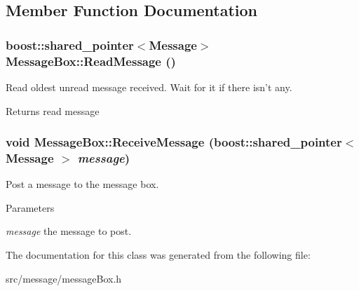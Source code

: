 \subsection{Member Function Documentation}
\hypertarget{classMessageBox_aea4614d2371b253e2e96f602bdd9c557}{
\subsubsection[{ReadMessage}]{\setlength{\rightskip}{0pt plus 5cm}boost::shared\_\-pointer$<$Message$>$ MessageBox::ReadMessage ()}}
\label{d2/da3/classMessageBox_aea4614d2371b253e2e96f602bdd9c557}
Read oldest unread message received. Wait for it if there isn't any. \begin{DoxyReturn}{Returns}
read message 
\end{DoxyReturn}
\hypertarget{classMessageBox_a26aab3fd74f9d025664448cef1fff9c0}{
\subsubsection[{ReceiveMessage}]{\setlength{\rightskip}{0pt plus 5cm}void MessageBox::ReceiveMessage (boost::shared\_\-pointer$<$ Message $>$ {\em message})}}
\label{d2/da3/classMessageBox_a26aab3fd74f9d025664448cef1fff9c0}
Post a message to the message box. 
\begin{DoxyParams}{Parameters}
\item[{\em message}]the message to post. \end{DoxyParams}


The documentation for this class was generated from the following file:\begin{DoxyCompactItemize}
\item 
src/message/messageBox.h\end{DoxyCompactItemize}
